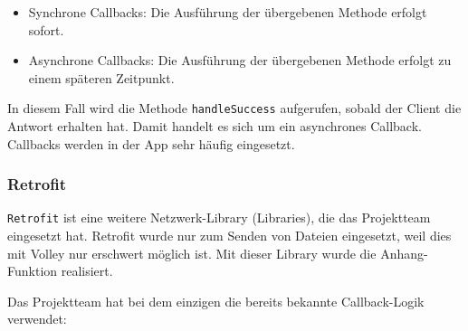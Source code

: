 \begin{itemize}
\tightlist
\item
  Synchrone Callbacks: Die Ausführung der übergebenen Methode erfolgt
  sofort.
\item
  Asynchrone Callbacks: Die Ausführung der übergebenen Methode erfolgt
  zu einem späteren Zeitpunkt.
\end{itemize}

In diesem Fall wird die Methode \texttt{handleSuccess} aufgerufen,
sobald der Client die Antwort erhalten hat. Damit handelt es sich um ein
asynchrones Callback. Callbacks werden in der App sehr häufig
eingesetzt.

\hypertarget{retrofit}{%
\subsubsection{Retrofit}\label{retrofit}}

\texttt{Retrofit} ist eine weitere Netzwerk-Library (\bzw Libraries),
die das Projektteam eingesetzt hat. Retrofit wurde nur zum Senden von
Dateien eingesetzt, weil dies mit Volley nur erschwert möglich ist. Mit
dieser Library wurde die Anhang-Funktion realisiert.

Das Projektteam hat bei dem einzigen die bereits bekannte Callback-Logik
verwendet:

\begin{Shaded}
\begin{Highlighting}[]
\NormalTok{(} \NormalTok{<}\NormalTok{>() \{}
      \NormalTok{<}
        \CommentTok{// }
\NormalTok{    \}}
      
        \CommentTok{// }
\NormalTok{    \}}
\NormalTok{\});}
\end{Highlighting}
\end{Shaded}

